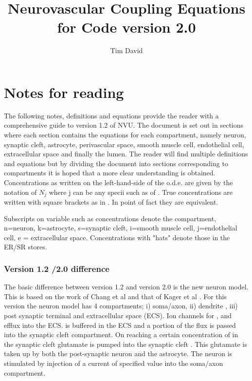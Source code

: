 \documentclass[fleqn]{report}
\numberwithin{equation}{section}
\numberwithin{equation}{section}
\newcommand{\Na}{\text{Na$^{+}$}}
\newcommand{\K}{\text{K$^+$}}
\newcommand{\Ca}{\text{Ca$^{2+}$}}
\newcommand{\Can}{\text{[Ca$^{2+}]_n$}}
\begin{document}
\author{Tim David}
\title{Neurovascular Coupling Equations for Code version 2.0 }
\maketitle
\newpage
\linenumbers
\listoftodos 
%
%
%
%
%
\chapter{Notes for reading}
The following notes, definitions and equations provide the reader with a comprehensive guide to version 1.2 of NVU. The document is set out in sections where each section contains the equations for each compartment, namely neuron, synaptic cleft, astrocyte, perivascular space, smooth muscle cell, endothelial cell, extracellular space and finally the lumen. The reader will find multiple definitions and equations but by dividing the document into sections corresponding to compartments it is hoped that a more clear understanding is obtained.
Concentrations as written on the left-hand-side of the o.d.e. are given by the notation of $N_j$ where j can be any specii such as \Na of \Ca. True concentrations are written with square brackets as in \Can . In point of fact they are equivalent.

Subscripts on variable such as concentrations denote the compartment, n=neuron, k=astrocyte, s=synaptic cleft, i=smooth muscle cell, j=endothelial cell, e = extracellular space.  Concentrations with "hats" denote those in the ER/SR stores. 
\subsection{Version 1.2 /2.0 difference}
 The basic difference between version 1.2 and version 2.0 is the new neuron model. This is based on the work of Chang et al \cite{Chang2013}	and that of Kager et al \cite{Kager2000a}. For this version the neuron model has  4 compartments; i) soma/axon, ii) dendrite , iii) post synaptic terminal and extracellular space (ECS). Ion channels for \Na, and \K efflux into the ECS.  \K is buffered in the ECS and a portion of the \K flux is passed into the synaptic cleft compartment. On reaching a certain concentration of \K in the synaptic cleft  glutamate is pumped into the synaptic cleft . This glutamate is taken up by both the post-synaptic neuron and the astrocyte. The neuron is stimulated by injection of a current of specified value into the soma/axon compartment. 
 
\end{document}
